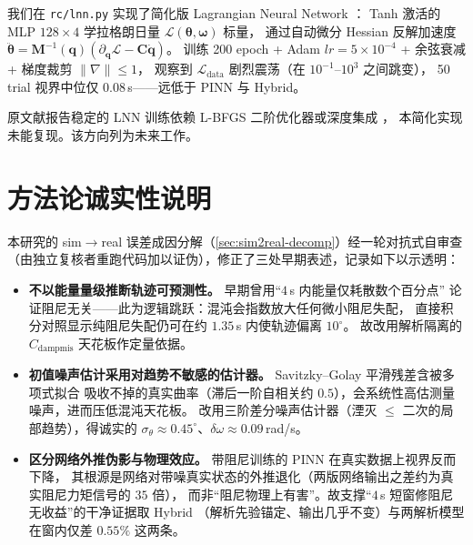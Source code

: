 \documentclass[a4paper,12pt]{ctexart}   %
\let\cite\supercite   %
\begin{document}
我们在 \texttt{rc/lnn.py} 实现了简化版 Lagrangian Neural Network \cite{cranmer2020}：
Tanh 激活的 MLP $128 \times 4$ 学拉格朗日量 $\mathcal{L}(\bm{\theta}, \bm{\omega})$ 标量，
通过自动微分 Hessian 反解加速度
$\ddot{\bm{\theta}} = \bm{M}^{-1}(\bm{q})\left(\partial_{\bm{q}} \mathcal{L} - \bm{C} \dot{\bm{q}}\right)$。
训练 200 epoch + Adam $lr = 5 \times 10^{-4}$ + 余弦衰减 + 梯度裁剪 $\|\nabla\| \le 1$，
观察到 $\mathcal{L}_{\mathrm{data}}$ 剧烈震荡（在 $10^{-1}$--$10^{3}$ 之间跳变），
50 trial 视界中位仅 $0.08$\,s——远低于 PINN 与 Hybrid。

原文献报告稳定的 LNN 训练依赖 L-BFGS 二阶优化器或深度集成 \cite{cranmer2020}，
本简化实现未能复现。该方向列为未来工作。

\section{方法论诚实性说明}
\label{sec:appendix-honesty}

本研究的 sim$\to$real 误差成因分解（\cref{sec:sim2real-decomp}）经一轮对抗式自审查
（由独立复核者重跑代码加以证伪），修正了三处早期表述，记录如下以示透明：

\begin{itemize}[leftmargin=2em]
  \item \textbf{不以能量量级推断轨迹可预测性。} 早期曾用“$4$\,s 内能量仅耗散数个百分点”
        论证阻尼无关——此为逻辑跳跃：混沌会指数放大任何微小阻尼失配，
        直接积分对照显示纯阻尼失配仍可在约 $1.35$\,s 内使轨迹偏离 $10^\circ$。
        故改用解析隔离的 $C_{\mathrm{dampmis}}$ 天花板作定量依据。
  \item \textbf{初值噪声估计采用对趋势不敏感的估计器。} Savitzky--Golay 平滑残差含被多项式拟合
        吸收不掉的真实曲率（滞后一阶自相关约 $0.5$），会系统性高估测量噪声，进而压低混沌天花板。
        改用三阶差分噪声估计器（湮灭 $\le$ 二次的局部趋势），得诚实的
        $\sigma_\theta \approx 0.45^\circ$、$\delta\omega \approx 0.09$\,rad/s。
  \item \textbf{区分网络外推伪影与物理效应。} 带阻尼训练的 PINN 在真实数据上视界反而下降，
        其根源是网络对带噪真实状态的外推退化（两版网络输出之差约为真实阻尼力矩信号的 $35$ 倍），
        而非“阻尼物理上有害”。故支撑“$4$\,s 短窗修阻尼无收益”的干净证据取 Hybrid
        （解析先验锚定、输出几乎不变）与两解析模型在窗内仅差 $0.55\%$ 这两条。
\end{itemize}
\end{document}
